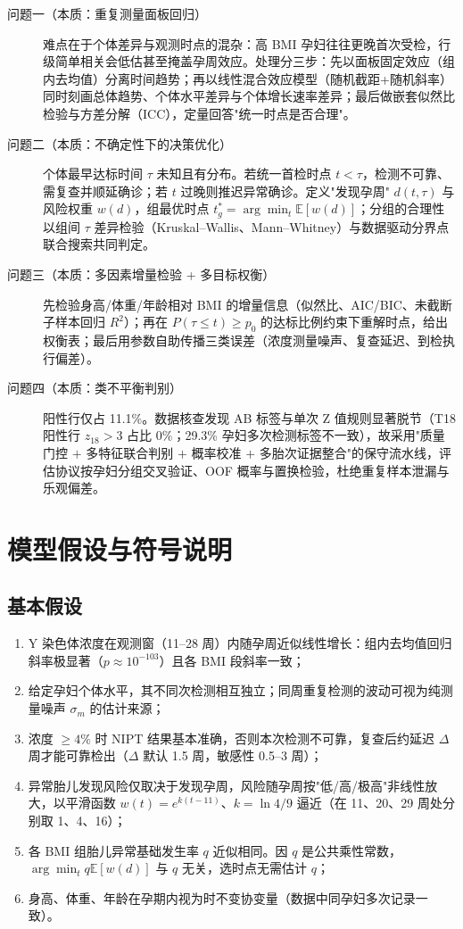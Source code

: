 \documentclass[11pt,a4paper]{ctexart}
\newcommand{\E}{\mathbb{E}}
\begin{document}
\begin{description}
\item[问题一（本质：重复测量面板回归）] 难点在于个体差异与观测时点的混杂：高 BMI 孕妇往往更晚首次受检，行级简单相关会低估甚至掩盖孕周效应。处理分三步：先以面板固定效应（组内去均值）分离时间趋势；再以线性混合效应模型（随机截距+随机斜率）同时刻画总体趋势、个体水平差异与个体增长速率差异；最后做嵌套似然比检验与方差分解（ICC），定量回答"统一时点是否合理"。
\item[问题二（本质：不确定性下的决策优化）] 个体最早达标时间 $\tau$ 未知且有分布。若统一首检时点 $t<\tau$，检测不可靠、需复查并顺延确诊；若 $t$ 过晚则推迟异常确诊。定义"发现孕周" $d(t,\tau)$ 与风险权重 $w(d)$，组最优时点 $t_g^{*}=\arg\min_t \E[w(d)]$；分组的合理性以组间 $\tau$ 差异检验（Kruskal--Wallis、Mann--Whitney）与数据驱动分界点联合搜索共同判定。
\item[问题三（本质：多因素增量检验 + 多目标权衡）] 先检验身高/体重/年龄相对 BMI 的增量信息（似然比、AIC/BIC、未截断子样本回归 $R^2$）；再在 $P(\tau\le t)\ge p_0$ 的达标比例约束下重解时点，给出权衡表；最后用参数自助传播三类误差（浓度测量噪声、复查延迟、到检执行偏差）。
\item[问题四（本质：类不平衡判别）] 阳性行仅占 11.1\%。数据核查发现 AB 标签与单次 Z 值规则显著脱节（T18 阳性行 $z_{18}>3$ 占比 $0\%$；29.3\% 孕妇多次检测标签不一致），故采用"质量门控 $+$ 多特征联合判别 $+$ 概率校准 $+$ 多胎次证据整合"的保守流水线，评估协议按孕妇分组交叉验证、OOF 概率与置换检验，杜绝重复样本泄漏与乐观偏差。
\end{description}

\section{模型假设与符号说明}
\subsection{基本假设}
\begin{enumerate}
\item Y 染色体浓度在观测窗（11--28 周）内随孕周近似线性增长：组内去均值回归斜率极显著（$p\approx10^{-103}$）且各 BMI 段斜率一致；
\item 给定孕妇个体水平，其不同次检测相互独立；同周重复检测的波动可视为纯测量噪声 $\sigma_m$ 的估计来源；
\item 浓度 $\ge4\%$ 时 NIPT 结果基本准确，否则本次检测不可靠，复查后约延迟 $\Delta$ 周才能可靠检出（$\Delta$ 默认 1.5 周，敏感性 0.5--3 周）；
\item 异常胎儿发现风险仅取决于发现孕周，风险随孕周按"低/高/极高"非线性放大，以平滑函数 $w(t)=e^{k(t-11)}$、$k=\ln4/9$ 逼近（在 11、20、29 周处分别取 1、4、16）；
\item 各 BMI 组胎儿异常基础发生率 $q$ 近似相同。因 $q$ 是公共乘性常数，$\arg\min_t q\E[w(d)]$ 与 $q$ 无关，选时点无需估计 $q$；
\item 身高、体重、年龄在孕期内视为时不变协变量（数据中同孕妇多次记录一致）。
\end{enumerate}
\end{document}
